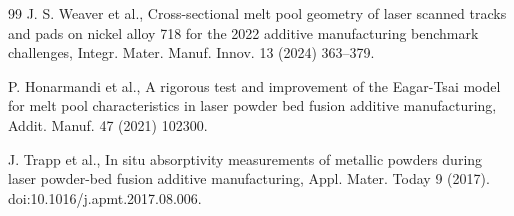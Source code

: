 \documentclass[final,5p,times,twocolumn]{elsarticle}
\begin{document}
\begin{thebibliography}{99}
J. S. Weaver et al., Cross-sectional melt pool geometry of laser scanned tracks and pads on nickel
alloy 718 for the 2022 additive manufacturing benchmark challenges, Integr. Mater. Manuf. Innov. 13 (2024) 363--379.

P. Honarmandi et al., A rigorous test and improvement of the
Eagar-Tsai model for melt pool characteristics in laser powder bed fusion
additive manufacturing, Addit. Manuf. 47 (2021) 102300.

J. Trapp et al., In situ absorptivity
measurements of metallic powders during laser powder-bed fusion additive
manufacturing, Appl. Mater. Today 9 (2017).
doi:10.1016/j.apmt.2017.08.006.

\end{thebibliography}
\end{document}
